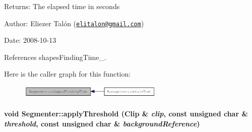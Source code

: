 \begin{Desc}
\item[Returns:]The elapsed time in seconds\end{Desc}
\begin{Desc}
\item[Author:]Eliezer Talón (\href{mailto:elitalon@gmail.com}{\tt elitalon@gmail.com}) \end{Desc}
\begin{Desc}
\item[Date:]2008-10-13 \end{Desc}


References shapesFindingTime\_\-.

Here is the caller graph for this function:\nopagebreak
\begin{figure}[H]
\begin{center}
\leavevmode
\includegraphics[width=196pt]{class_segmenter_8d7304b35b1891b1c7154a3ac2ff2c4b_icgraph}
\end{center}
\end{figure}
\hypertarget{class_segmenter_6854315e3320f9d9a8ece14cbb8570ee}{
\paragraph[applyThreshold]{\setlength{\rightskip}{0pt plus 5cm}void Segmenter::applyThreshold ({\bf Clip} \& {\em clip}, \/  const unsigned char \& {\em threshold}, \/  const unsigned char \& {\em backgroundReference})}\hfill}
\label{class_segmenter_6854315e3320f9d9a8ece14cbb8570ee}


